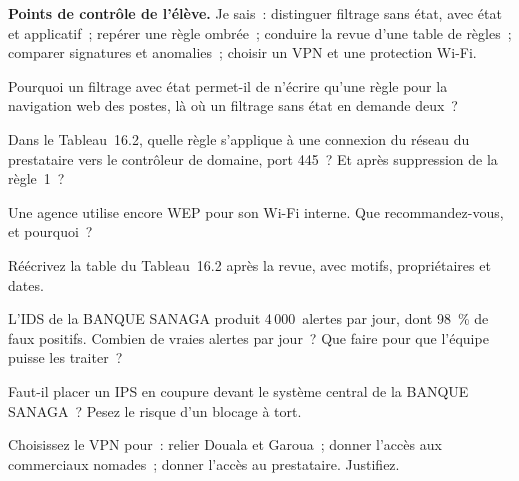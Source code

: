 \begin{boxinfo}
\textbf{Points de contrôle de l'élève.} Je sais~: distinguer filtrage sans
état, avec état et applicatif~; repérer une règle ombrée~; conduire la
revue d'une table de règles~; comparer signatures et anomalies~; choisir
un VPN et une protection Wi-Fi.
\end{boxinfo}

\bigskip

\begin{boxexo}[title={\ding{45}\quad Exercice~16.1. Avec ou sans état \niveaubase}]
Pourquoi un filtrage avec état permet-il de n'écrire qu'une règle pour la
navigation web des postes, là où un filtrage sans état en demande deux~?
\end{boxexo}

\begin{boxexo}[title={\ding{45}\quad Exercice~16.2. L'ordre \niveaubase}]
Dans le Tableau~16.2, quelle règle s'applique à une connexion du réseau
du prestataire vers le contrôleur de domaine, port 445~? Et après
suppression de la règle~1~?
\end{boxexo}

\begin{boxexo}[title={\ding{45}\quad Exercice~16.3. Wi-Fi \niveaubase}]
Une agence utilise encore WEP pour son Wi-Fi interne. Que recommandez-vous,
et pourquoi~?
\end{boxexo}

\begin{boxexo}[title={\ding{45}\quad Exercice~16.4. Réécrire les règles \niveaumoyen}]
Réécrivez la table du Tableau~16.2 après la revue, avec motifs,
propriétaires et dates.
\end{boxexo}

\begin{boxexo}[title={\ding{45}\quad Exercice~16.5. Faux positifs \niveaumoyen}]
L'IDS de la BANQUE SANAGA produit 4\,000~alertes par jour, dont 98~\% de
faux positifs. Combien de vraies alertes par jour~? Que faire pour que
l'équipe puisse les traiter~?
\end{boxexo}

\begin{boxexo}[title={\ding{45}\quad Exercice~16.6. IPS ou IDS \niveaumoyen}]
Faut-il placer un IPS en coupure devant le système central de la BANQUE
SANAGA~? Pesez le risque d'un blocage à tort.
\end{boxexo}

\begin{boxexo}[title={\ding{45}\quad Exercice~16.7. VPN \niveaumoyen}]
Choisissez le VPN pour~: relier Douala et Garoua~; donner l'accès aux
commerciaux nomades~; donner l'accès au prestataire. Justifiez.
\end{boxexo}

